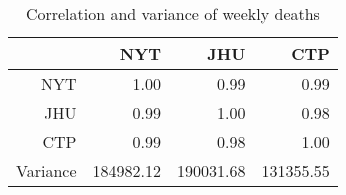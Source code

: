 \begin{table}[ht]
\centering
\begin{tabular}{rrrr}
  \hline
 & NYT & JHU & CTP \\ 
  \hline
NYT & 1.00 & 0.99 & 0.99 \\ 
  JHU & 0.99 & 1.00 & 0.98 \\ 
  CTP & 0.99 & 0.98 & 1.00 \\ 
  Variance & 184982.12 & 190031.68 & 131355.55 \\ 
   \hline
\end{tabular}
\caption{Correlation and variance of weekly deaths\label{tab:weekdeathcor}} 
\end{table}
